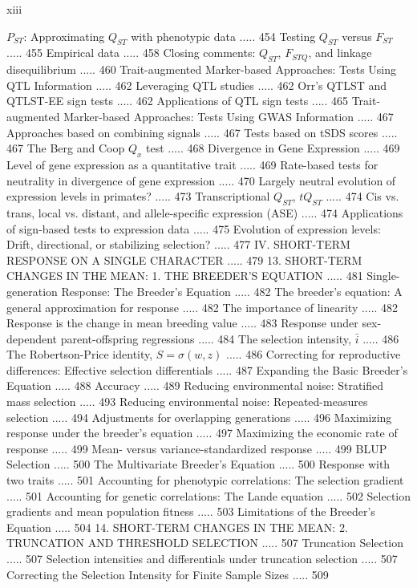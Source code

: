 \documentclass{article}
\begin{document}
xiii

$P_{ST}$: Approximating $Q_{ST}$ with phenotypic data ..... 454
Testing $Q_{ST}$ versus $F_{ST}$ ..... 455
Empirical data ..... 458
Closing comments: $Q_{ST}$, $F_{STQ}$, and linkage disequilibrium ..... 460
Trait-augmented Marker-based Approaches: Tests Using QTL Information ..... 462
Leveraging QTL studies ..... 462
Orr's QTLST and QTLST-EE sign tests ..... 462
Applications of QTL sign tests ..... 465
Trait-augmented Marker-based Approaches: Tests Using GWAS Information ..... 467
Approaches based on combining signals ..... 467
Tests based on tSDS scores ..... 467
The Berg and Coop $Q_{x}$ test ..... 468
Divergence in Gene Expression ..... 469
Level of gene expression as a quantitative trait ..... 469
Rate-based tests for neutrality in divergence of gene expression ..... 470
Largely neutral evolution of expression levels in primates? ..... 473
Transcriptional $Q_{ST}$, $tQ_{ST}$ ..... 474
Cis vs. trans, local vs. distant, and allele-specific expression (ASE) ..... 474
Applications of sign-based tests to expression data ..... 475
Evolution of expression levels: Drift, directional, or stabilizing selection? ..... 477
IV. SHORT-TERM RESPONSE ON A SINGLE CHARACTER ..... 479
13. SHORT-TERM CHANGES IN THE MEAN:
1. THE BREEDER'S EQUATION ..... 481
Single-generation Response: The Breeder's Equation ..... 482
The breeder's equation: A general approximation for response ..... 482
The importance of linearity ..... 482
Response is the change in mean breeding value ..... 483
Response under sex-dependent parent-offspring regressions ..... 484
The selection intensity, $\bar{i}$ ..... 486
The Robertson-Price identity, $S=\sigma(w,z)$ ..... 486
Correcting for reproductive differences: Effective selection differentials ..... 487
Expanding the Basic Breeder's Equation ..... 488
Accuracy ..... 489
Reducing environmental noise: Stratified mass selection ..... 493
Reducing environmental noise: Repeated-measures selection ..... 494
Adjustments for overlapping generations ..... 496
Maximizing response under the breeder's equation ..... 497
Maximizing the economic rate of response ..... 499
Mean- versus variance-standardized response ..... 499
BLUP Selection ..... 500
The Multivariate Breeder's Equation ..... 500
Response with two traits ..... 501
Accounting for phenotypic correlations: The selection gradient ..... 501
Accounting for genetic correlations: The Lande equation ..... 502
Selection gradients and mean population fitness ..... 503
Limitations of the Breeder's Equation ..... 504
14. SHORT-TERM CHANGES IN THE MEAN:
2. TRUNCATION AND THRESHOLD SELECTION ..... 507
Truncation Selection ..... 507
Selection intensities and differentials under truncation selection ..... 507
Correcting the Selection Intensity for Finite Sample Sizes ..... 509
\end{document}

